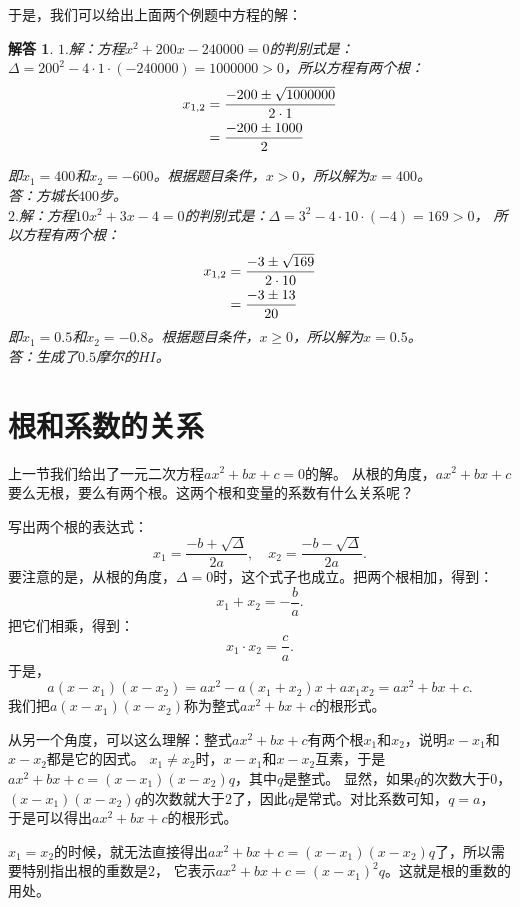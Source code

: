 \documentclass[12pt,UTF8]{ctexbook}
\newtheorem*{so}{解答}
\begin{document}
于是，我们可以给出上面两个例题中方程的解：
\begin{so}
    $1.$解：方程$ x^2 + 200x - 240000 = 0$的判别式是：
    $\Delta = 200^2 - 4\cdot 1\cdot (-240000) = 1000000 > 0$，所以方程有两个根：
    \begin{align}
        x_{1,2} &= \frac{-200 \pm \sqrt{1000000}}{2\cdot 1} \notag \\
        &= \frac{-200 \pm 1000}{2} \notag
    \end{align}

    即$x_1 = 400$和$x_2 = -600$。根据题目条件，$x>0$，所以解为$x = 400$。\\
    答：方城长$400$步。\\
    $2.$解：方程$10x^2 + 3x - 4 = 0$的判别式是：$\Delta = 3^2 - 4\cdot 10\cdot (-4) = 169 > 0$，
    所以方程有两个根：
    \begin{align}
        x_{1,2} &= \frac{-3 \pm \sqrt{169}}{2\cdot 10} \notag \\
        &= \frac{-3 \pm 13}{20} \notag
    \end{align}
    即$x_1 = 0.5$和$x_2 = -0.8$。根据题目条件，$x\geqslant 0$，所以解为$x = 0.5$。\\
    答：生成了$0.5$摩尔的$HI$。
\end{so}

\section{根和系数的关系}

上一节我们给出了一元二次方程$ax^2 + bx + c = 0$的解。
从根的角度，$ax^2 + bx + c $要么无根，要么有两个根。这两个根和变量的系数有什么关系呢？

写出两个根的表达式：
$$x_{1} = \frac{-b + \sqrt{\Delta}}{2a},\quad x_{2} = \frac{-b - \sqrt{\Delta}}{2a}.$$
要注意的是，从根的角度，$\Delta = 0$时，这个式子也成立。把两个根相加，得到：
$$ x_1 + x_2 = -\frac{b}{a}.$$
把它们相乘，得到：
$$ x_1 \cdot x_2 = \frac{c}{a}.$$
于是，
$$a(x - x_1)(x - x_2) = ax^2 - a(x_1 + x_2)x + ax_1x_2 = ax^2 + bx+c.$$
我们把$a(x - x_1)(x - x_2)$称为整式$ax^2 + bx+c$的根形式。

从另一个角度，可以这么理解：整式$ax^2 + bx + c$有两个根$x_1$和$x_2$，说明$x - x_1$和$x - x_2$都是它的因式。
$x_1 \neq x_2$时，$x - x_1$和$x - x_2$互素，于是$ax^2 + bx + c = (x - x_1)(x-x_2)q$，其中$q$是整式。
显然，如果$q$的次数大于$0$，$(x - x_1)(x-x_2)q$的次数就大于$2$了，因此$q$是常式。对比系数可知，$q = a$，
于是可以得出$ax^2 + bx+c$的根形式。

$x_1 = x_2$的时候，就无法直接得出$ax^2 + bx + c = (x - x_1)(x-x_2)q$了，所以需要特别指出根的重数是$2$，
它表示$ax^2 + bx + c = (x - x_1)^2 q$。这就是根的重数的用处。
\end{document}

